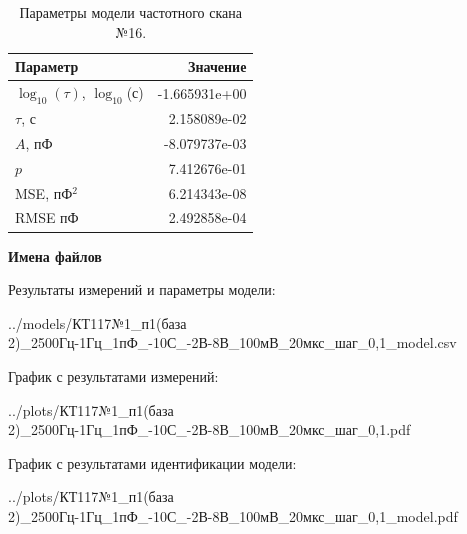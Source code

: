 \begin{table}[!ht]
    \centering
    \caption{Параметры модели частотного скана №16.}
    \begin{tabular}{|l|r|}
        \hline
        Параметр                                       & Значение                  \\ \hline
        $\log_{10}(\tau)$, $\log_{10}$(с)              & -1.665931e+00             \\ \hline
        $\tau$, с                                      & 2.158089e-02              \\ \hline
        $A$, пФ                                        & -8.079737e-03             \\ \hline
        $p$                                            & 7.412676e-01              \\ \hline
        MSE, пФ$^2$                                    & 6.214343e-08              \\ \hline
        RMSE пФ                                        & 2.492858e-04              \\ \hline
    \end{tabular}
    \label{table:frequency_scan_model_16}
\end{table}

\textbf{Имена файлов}

Результаты измерений и параметры модели:

\scriptsize../models/КТ117№1\_п1(база 2)\_2500Гц-1Гц\_1пФ\_-10С\_-2В-8В\_100мВ\_20мкс\_шаг\_0,1\_model.csv
\normalsize

График с результатами измерений:

\scriptsize../plots/КТ117№1\_п1(база 2)\_2500Гц-1Гц\_1пФ\_-10С\_-2В-8В\_100мВ\_20мкс\_шаг\_0,1.pdf
\normalsize

График с результатами идентификации модели:

\scriptsize../plots/КТ117№1\_п1(база 2)\_2500Гц-1Гц\_1пФ\_-10С\_-2В-8В\_100мВ\_20мкс\_шаг\_0,1\_model.pdf
\normalsize

